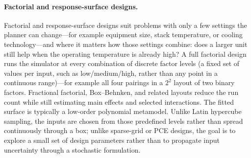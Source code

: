 \paragraph{Factorial and response-surface designs.}
Factorial and response-surface designs suit problems with only a few
settings the planner can change---for example equipment size, stack
temperature, or cooling technology---and where it matters how those
settings combine: does a larger unit still help when the operating
temperature is already high? A full factorial design runs the simulator
at every combination of discrete factor levels (a fixed set of values
per input, such as low/medium/high, rather than any point in a
continuous range)---for example all four pairings in a $2^2$ layout of
two binary factors. Fractional factorial, Box--Behnken, and related
layouts reduce the run count while still estimating main effects and
selected interactions. The fitted surface is typically a low-order
polynomial metamodel. Unlike Latin hypercube sampling, the inputs are
chosen from those predefined levels rather than spread continuously
through a box; unlike sparse-grid or PCE designs, the goal is to
explore a small set of design parameters rather than to propagate input
uncertainty through a stochastic formulation.

